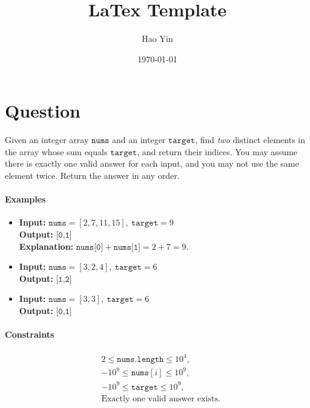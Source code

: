 \documentclass[12pt]{article}
\begin{document}
\title{LaTex Template}
\author{Hao Yin}
\date{\today}
\maketitle

\section*{Question}
    Given an integer array \(\texttt{nums}\) and an integer \(\texttt{target}\), 
        find \emph{two} distinct elements in the array whose sum equals 
        \(\texttt{target}\), and return their indices.
    You may assume there is exactly one valid answer for each input, and you may
        not use the same element twice.  
        Return the answer in any order.

    \paragraph{Examples}
    \begin{itemize}
    \item \textbf{Input:} \(\texttt{nums} = [2,7,11,15],\ \texttt{target} = 9\) 
        \\ \textbf{Output:} \(\texttt{[0,1]}\) \\
        \textbf{Explanation:} \(\texttt{nums[0]} + \texttt{nums[1]} = 2 + 7 
            = 9\).
    \item \textbf{Input:} \(\texttt{nums} = [3,2,4],\ \texttt{target} = 6\) \\
            \textbf{Output:} \(\texttt{[1,2]}\)
    \item \textbf{Input:} \(\texttt{nums} = [3,3],\ \texttt{target} = 6\) \\
            \textbf{Output:} \(\texttt{[0,1]}\)
    \end{itemize}

    \paragraph{Constraints}
    \[
    \begin{aligned}
    &2 \le \texttt{nums.length} \le 10^{4},\\
    &-10^{9} \le \texttt{nums}[i] \le 10^{9},\\
    &-10^{9} \le \texttt{target} \le 10^{9},\\
    &\text{Exactly one valid answer exists.}
    \end{aligned}
    \]
\end{document}
